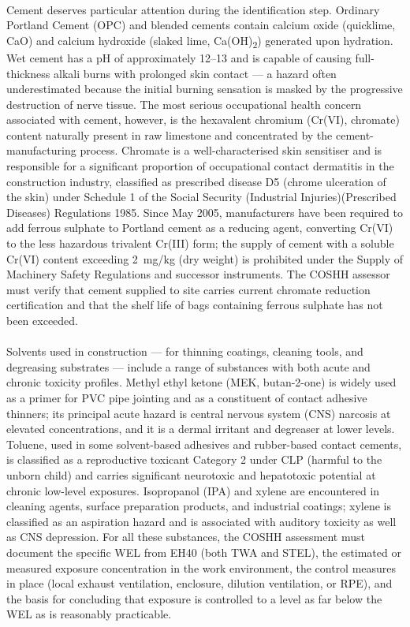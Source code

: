 \paragraph{}
Cement deserves particular attention during the identification step. Ordinary Portland Cement (OPC) and blended cements contain calcium oxide (quicklime, CaO) and calcium hydroxide (slaked lime, Ca(OH)\textsubscript{2}) generated upon hydration. Wet cement has a pH of approximately 12--13 and is capable of causing full-thickness alkali burns with prolonged skin contact — a hazard often underestimated because the initial burning sensation is masked by the progressive destruction of nerve tissue. The most serious occupational health concern associated with cement, however, is the hexavalent chromium (Cr(VI), chromate) content naturally present in raw limestone and concentrated by the cement-manufacturing process. Chromate is a well-characterised skin sensitiser and is responsible for a significant proportion of occupational contact dermatitis in the construction industry, classified as prescribed disease D5 (chrome ulceration of the skin) under Schedule 1 of the Social Security (Industrial Injuries)(Prescribed Diseases) Regulations 1985. Since May 2005, manufacturers have been required to add ferrous sulphate to Portland cement as a reducing agent, converting Cr(VI) to the less hazardous trivalent Cr(III) form; the supply of cement with a soluble Cr(VI) content exceeding 2~mg/kg (dry weight) is prohibited under the Supply of Machinery Safety Regulations and successor instruments. The COSHH assessor must verify that cement supplied to site carries current chromate reduction certification and that the shelf life of bags containing ferrous sulphate has not been exceeded.

\paragraph{}
Solvents used in construction — for thinning coatings, cleaning tools, and degreasing substrates — include a range of substances with both acute and chronic toxicity profiles. Methyl ethyl ketone (MEK, butan-2-one) is widely used as a primer for PVC pipe jointing and as a constituent of contact adhesive thinners; its principal acute hazard is central nervous system (CNS) narcosis at elevated concentrations, and it is a dermal irritant and degreaser at lower levels. Toluene, used in some solvent-based adhesives and rubber-based contact cements, is classified as a reproductive toxicant Category 2 under CLP (harmful to the unborn child) and carries significant neurotoxic and hepatotoxic potential at chronic low-level exposures. Isopropanol (IPA) and xylene are encountered in cleaning agents, surface preparation products, and industrial coatings; xylene is classified as an aspiration hazard and is associated with auditory toxicity as well as CNS depression. For all these substances, the COSHH assessment must document the specific WEL from EH40 (both TWA and STEL), the estimated or measured exposure concentration in the work environment, the control measures in place (local exhaust ventilation, enclosure, dilution ventilation, or RPE), and the basis for concluding that exposure is controlled to a level as far below the WEL as is reasonably practicable.

